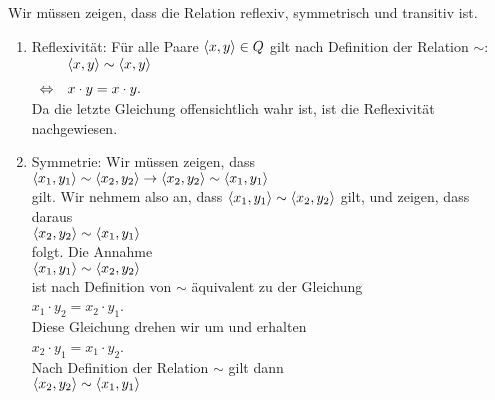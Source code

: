 \proof
Wir m\"{u}ssen zeigen, dass die Relation reflexiv, symmetrisch und transitiv ist.
\begin{enumerate}
\item Reflexivit\"{a}t: F\"{u}r alle Paare $\pair(x,y) \in Q$ gilt nach Definition der Relation $\sim$:
      \\[0.2cm]
      \hspace*{1.3cm}
      $
      \begin{array}[t]{cll}
                      & \pair(x,y) \sim \pair(x,y) \\[0.2cm]
      \Leftrightarrow & x \cdot y = x \cdot y.
      \end{array}
      $
      \\[0.2cm]
      Da die letzte Gleichung offensichtlich wahr ist, ist die Reflexivit\"{a}t nachgewiesen. \checkmark
\item Symmetrie: Wir m\"{u}ssen zeigen, dass
      \\[0.2cm]
      \hspace*{1.3cm}
      $\pair(x_1, y_1) \sim \pair(x_2, y_2) \rightarrow \pair(x_2, y_2) \sim \pair(x_1, y_1)$
      \\[0.2cm]
      gilt.  Wir nehmem also an, dass $\pair(x_1, y_1) \sim \pair(x_2, y_2)$ gilt, und zeigen, dass 
      daraus 
      \\[0.2cm]
      \hspace*{1.3cm}
      $\pair(x_2, y_2) \sim \pair(x_1, y_1)$ 
      \\[0.2cm]
      folgt.  Die Annahme 
      \\[0.2cm]
      \hspace*{1.3cm}
      $\pair(x_1, y_1) \sim \pair(x_2, y_2)$
      \\[0.2cm]
      ist nach Definition von $\sim$ \"{a}quivalent zu der Gleichung
      \\[0.2cm]
      \hspace*{1.3cm}
      $x_1 \cdot y_2 = x_2 \cdot y_1$.
      \\[0.2cm]
      Diese Gleichung drehen wir um und erhalten
      \\[0.2cm]
      \hspace*{1.3cm}
      $x_2 \cdot y_1 = x_1 \cdot y_2$.
      \\[0.2cm]
      Nach Definition der Relation $\sim$ gilt dann
      \\[0.2cm]
      \hspace*{1.3cm}
      $\pair(x_2, y_2) \sim \pair(x_1, y_1)$
      \\[0.2cm]

\end{enumerate}
